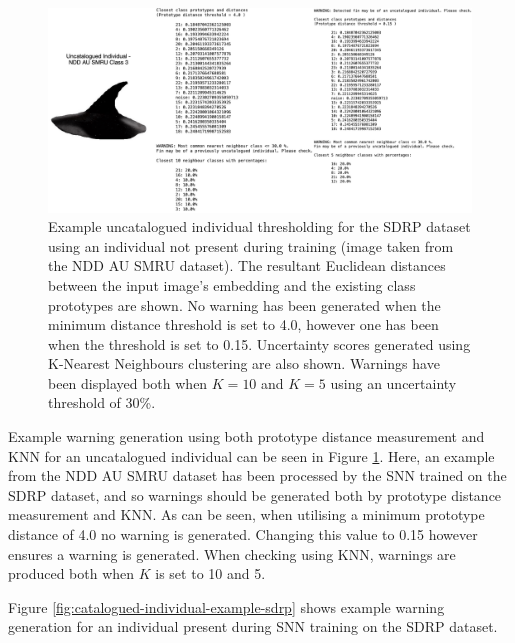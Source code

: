 \begin{figure}
	\begin{center}
		\includegraphics[scale=0.5]{Chapter6/figs/uncatalogued-individual-thresholding.png}
	\end{center}
	\caption{Example uncatalogued individual thresholding for the SDRP dataset using an individual not present during training (image taken from the NDD AU SMRU dataset). The resultant Euclidean distances between the input image's embedding and the existing class prototypes are shown. No warning has been generated when the minimum distance threshold is set to 4.0, however one has been when the threshold is set to 0.15. Uncertainty scores generated using K-Nearest Neighbours clustering are also shown. Warnings have been displayed both when $K = 10$ and $K = 5$ using an uncertainty threshold of 30\%.}
	\label{fig:uncatalogued-individual-example-sdrp}
\end{figure}

Example warning generation using both prototype distance measurement and KNN for an uncatalogued individual can be seen in Figure \ref{fig:uncatalogued-individual-example-sdrp}. Here, an example from the NDD AU SMRU dataset has been processed by the SNN trained on the SDRP dataset, and so warnings should be generated both by prototype distance measurement and KNN. As can be seen, when utilising a minimum prototype distance of 4.0 no warning is generated. Changing this value to 0.15 however ensures a warning is generated. When checking using KNN, warnings are produced both when $K$ is set to 10 and 5.

Figure \ref{fig:catalogued-individual-example-sdrp} shows example warning generation for an individual present during SNN training on the SDRP dataset. 




